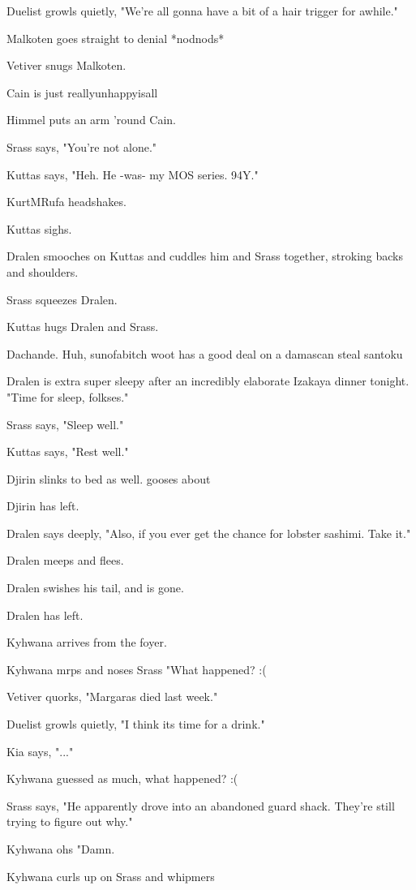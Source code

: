 Duelist growls quietly, "We're all gonna have a bit of a hair trigger for awhile."

Malkoten goes straight to denial *nodnods*

Vetiver snugs Malkoten.

Cain is just reallyunhappyisall

Himmel puts an arm 'round Cain.

Srass says, "You're not alone."

Kuttas says, "Heh. He -was- my MOS series. 94Y."

KurtMRufa headshakes.

Kuttas sighs.

Dralen smooches on Kuttas and cuddles him and Srass together, stroking backs and shoulders.

Srass squeezes Dralen.

Kuttas hugs Dralen and Srass.

Dachande. Huh, sunofabitch woot has a good deal on a damascan steal santoku

Dralen is extra super sleepy after an incredibly elaborate Izakaya dinner tonight. "Time for sleep, folkses."

Srass says, "Sleep well."

Kuttas says, "Rest well."

Djirin slinks to bed as well.  gooses about

Djirin has left.

Dralen says deeply, "Also, if you ever get the chance for lobster sashimi. Take it."

Dralen meeps and flees.

Dralen swishes his tail, and is gone.

Dralen has left.

Kyhwana arrives from the foyer.

Kyhwana mrps and noses Srass "What happened? :(

Vetiver quorks, "Margaras died last week."

Duelist growls quietly, "I think its time for a drink."

Kia says, "..."

Kyhwana guessed as much, what happened? :(

Srass says, "He apparently drove into an abandoned guard shack.  They're still trying to figure out why."

Kyhwana ohs "Damn.

Kyhwana curls up on Srass and whipmers

